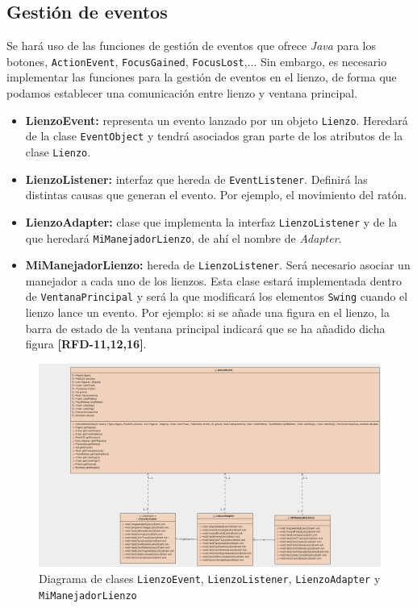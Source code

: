 \subsection{Gestión de eventos}
Se hará uso de las funciones de gestión de eventos que ofrece \textit{Java} para los botones, \texttt{ActionEvent}, \texttt{FocusGained}, \texttt{FocusLost},... Sin embargo, es necesario implementar las funciones para la gestión de eventos en el lienzo, de forma que podamos establecer una comunicación entre lienzo y ventana principal.
\begin{itemize}
\item{\textbf{LienzoEvent:} representa un evento lanzado por un objeto \texttt{Lienzo}. Heredará de la clase \texttt{EventObject} y tendrá asociados gran parte de los atributos de la clase \texttt{Lienzo}.}
\item{\textbf{LienzoListener:} interfaz que hereda de \texttt{EventListener}. Definirá las distintas causas que generan el evento. Por ejemplo, el movimiento del ratón.}
\item{\textbf{LienzoAdapter:} clase que implementa la interfaz \texttt{LienzoListener} y de la que heredará \texttt{MiManejadorLienzo}, de ahí el nombre de \textit{Adapter}.}
\item{\textbf{MiManejadorLienzo:} hereda de \texttt{LienzoListener}. Será necesario asociar un manejador a cada uno de los lienzos. Esta clase estará implementada dentro de \texttt{VentanaPrincipal} y será la que modificará los elementos \texttt{Swing} cuando el lienzo lance un evento. Por ejemplo: si se añade una figura en el lienzo, la barra de estado de la ventana principal indicará que se ha añadido dicha figura \textbf{[RFD-11,12,16]}.}
\end{itemize}

\vskip0.3cm
\begin{figure}
 \centering
  \includegraphics[width=1.1\textwidth]{diagramas/LienzoEvent.png}
 \caption{Diagrama de clases \texttt{LienzoEvent}, \texttt{LienzoListener}, \texttt{LienzoAdapter} y \texttt{MiManejadorLienzo}}
 \label{diseño}
 \end{figure}

